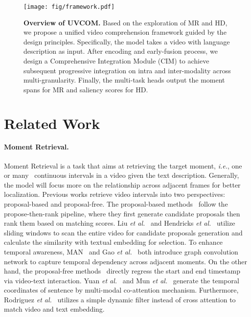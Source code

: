 \documentclass[10pt,twocolumn,letterpaper]{article}
\begin{document}
\begin{figure*}
    \centering
    \texttt{[image: fig/framework.pdf]}
    \caption{\textbf{Overview of UVCOM.} Based on the exploration of MR and HD, we propose a unified video comprehension framework guided by the design principles. Specifically, the model takes a video with language description as input. After encoding and early-fusion process, we design a Comprehensive Integration Module (CIM) to achieve subsequent progressive integration on intra and inter-modality across multi-granularity. Finally, the multi-task heads output the moment spans for MR and saliency scores for HD.}
    \label{fig:framework}
    \vspace{-10pt}
\end{figure*}
 \section{Related Work}
\label{sec:related_work}
\paragraph{Moment Retrieval.} Moment Retrieval is a task that aims at retrieving the target moment, \textit{i.e.}, one~\cite{ctrl} or many~\cite{tvr} continuous intervals in a video given the text description. Generally, the model will focus more on the relationship across adjacent frames for better localization. Previous works retrieve video intervals into two perspectives: proposal-based and proposal-free. The proposal-based methods~\cite{hendricks, bpn, ctrl, mpn} follow the propose-then-rank pipeline, where they first generate candidate proposals then rank them based on matching scores. Liu \textit{et al.}~\cite{liumeng-2018} and Hendricks \textit{et al.}~\cite{hendricks} utilize sliding windows to scan the entire video for candidate proposals generation and calculate the similarity with textual embedding for selection. 
To enhance temporal awareness, MAN~\cite{man} and Gao \textit{et al.}~\cite{gao_2021} both introduce graph convolution network to capture temporal dependency across adjacent moments. 
On the other hand, the proposal-free methods~\cite{yuan_2019, mun_2020, rodriguez_2020, VSLNET, li_2021, Tang_2022} directly regress the start and end timestamp via video-text interaction. Yuan \textit{et al.}~\cite{yuan_2019} and Mun \textit{et al.}~\cite{mun_2020} generate the temporal coordinates of sentence by multi-modal co-attention mechanism. Furthermore, Rodriguez \textit{et al.}~\cite{rodriguez_2020} utilizes a simple dynamic filter instead of cross attention to match video and text embedding. 
\end{document}
